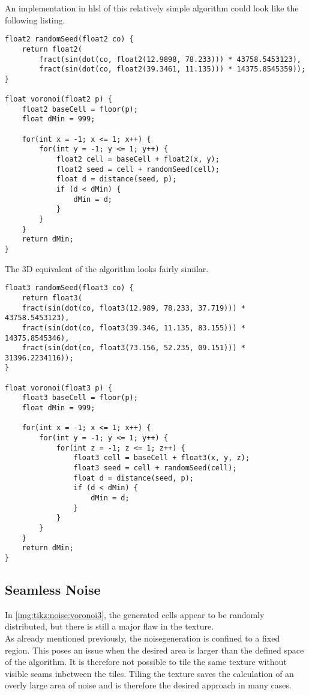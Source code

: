 \noindent
An implementation in \gls{hlsl} of this relatively simple algorithm could look like the following listing.
\begin{lstlisting}[language=HLSL, caption=Implementation of 2D Voronoi \gls{noise} algorithm., label=lst:shader:noise:voronoi2d]
float2 randomSeed(float2 co) {
    return float2(
        fract(sin(dot(co, float2(12.9898, 78.233))) * 43758.5453123),
        fract(sin(dot(co, float2(39.3461, 11.135))) * 14375.8545359));
}

float voronoi(float2 p) {
    float2 baseCell = floor(p);
    float dMin = 999;

    for(int x = -1; x <= 1; x++) {
        for(int y = -1; y <= 1; y++) {
            float2 cell = baseCell + float2(x, y);
            float2 seed = cell + randomSeed(cell);
            float d = distance(seed, p);
            if (d < dMin) {
                dMin = d;
            }
        }
    }
    return dMin;
}
\end{lstlisting}

\noindent
The 3D equivalent of the algorithm looks fairly similar.

\begin{lstlisting}[language=HLSL, caption=Implementation of 3D Voronoi \gls{noise} algorithm., label=lst:shader:noise:voronoi3d]
float3 randomSeed(float3 co) {
    return float3(
    fract(sin(dot(co, float3(12.989, 78.233, 37.719))) * 43758.5453123),
    fract(sin(dot(co, float3(39.346, 11.135, 83.155))) * 14375.8545346),
    fract(sin(dot(co, float3(73.156, 52.235, 09.151))) * 31396.2234116));
}

float voronoi(float3 p) {
    float3 baseCell = floor(p);
    float dMin = 999;

    for(int x = -1; x <= 1; x++) {
        for(int y = -1; y <= 1; y++) {
            for(int z = -1; z <= 1; z++) {
                float3 cell = baseCell + float3(x, y, z);
                float3 seed = cell + randomSeed(cell);
                float d = distance(seed, p);
                if (d < dMin) {
                    dMin = d;
                }
            }
        }
    }
    return dMin;
}
\end{lstlisting}

\subsection{Seamless Noise}
\label{section:noise:seamless}
In \autoref{img:tikz:noise:voronoi3}, the generated cells appear to be randomly distributed, but there is still a major flaw in the texture.
\\
As already mentioned previously, the \gls{noisegeneration} is confined to a fixed region.
This poses an issue when the desired area is larger than the defined space of the algorithm.
It is therefore not possible to tile the same texture without visible seams inbetween the tiles.
Tiling the texture saves the calculation of an overly large area of \gls{noise} and is therefore the desired approach in many cases.

